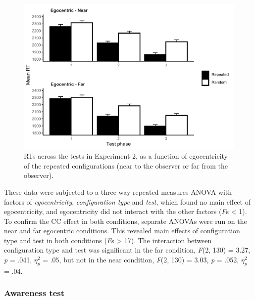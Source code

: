 \documentclass[
  english,
  man,floatsintext]{apa7}
\begin{document}
\begin{figure}

{\centering \includegraphics[width=1\linewidth]{CCVR_manuscript_files/figure-latex/Exp2-ego-figure-1} 

}

\caption{RTs across the tests in Experiment 2, as a function of egocentricity of the repeated configurations (near to the observer or far from the observer).}\label{fig:Exp2-ego-figure}
\end{figure}

These data were subjected to a three-way repeated-measures ANOVA with factors of \emph{egocentricity}, \emph{configuration type} and \emph{test}, which found no main effect of egocentricity, and egocentricity did not interact with the other factors (\emph{F}s \textless{} 1). To confirm the CC effect in both conditions, separate ANOVAs were run on the near and far egocentric conditions. This revealed main effects of configuration type and test in both conditions (\emph{F}s \textgreater{} 17). The interaction between configuration type and test was significant in the far condition, \emph{F}(2, 130) = 3.27, \emph{p} = .041, \(\eta^2_p\) = .05, but not in the near condition, \emph{F}(2, 130) = 3.03, \emph{p} = .052, \(\eta^2_p\) = .04.

\hypertarget{awareness-test}{%
\subsubsection{Awareness test}\label{awareness-test}}
\end{document}
